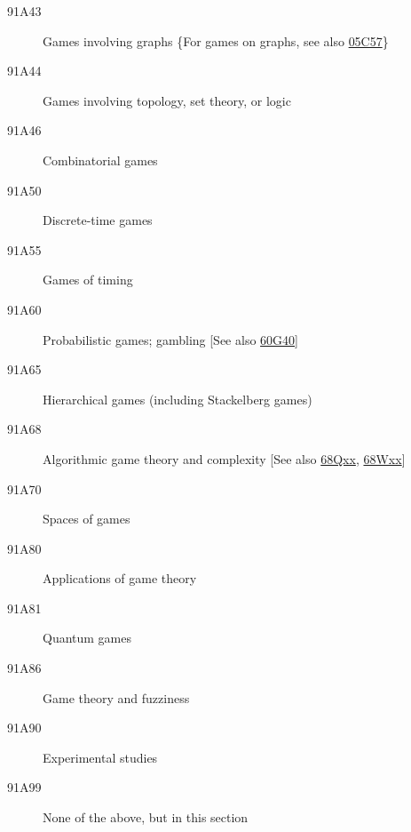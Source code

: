 \begin{description}
\item [91A43]\label{91A43} Games involving graphs \{For games on graphs, see also \hyperref[05C57]{05C57}\}
\item [91A44]\label{91A44} Games involving topology, set theory, or logic
\item [91A46]\label{91A46} Combinatorial games
\item [91A50]\label{91A50} Discrete-time games
\item [91A55]\label{91A55} Games of timing
\item [91A60]\label{91A60} Probabilistic games; gambling [See also \hyperref[60G40]{60G40}]
\item [91A65]\label{91A65} Hierarchical games (including Stackelberg games)
\item [91A68]\label{91A68} Algorithmic game theory and complexity [See also \hyperref[68Qxx]{68Qxx}, \hyperref[68Wxx]{68Wxx}]
\item [91A70]\label{91A70} Spaces of games
\item [91A80]\label{91A80} Applications of game theory
\item [91A81]\label{91A81} Quantum games
\item [91A86]\label{91A86} Game theory and fuzziness
\item [91A90]\label{91A90} Experimental studies
\item [91A99]\label{91A99} None of the above, but in this section
\end{description}
